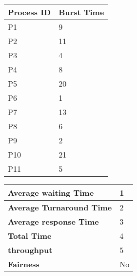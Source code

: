 \documentclass{article}
\begin{document}
\vspace{\baselineskip}
\hspace{1cm}
\begin{minipage}[t]{0.3\textwidth}
    \begin{tabularx}{\textwidth}{|l|X|}
    \hline
    \textbf{Process ID} & \textbf{Burst Time}\\
    \hline
    P1 & 9 \\
    P2 & 11 \\
    P3 & 4 \\
    P4 & 8 \\
    P5 & 20 \\
    P6 & 1 \\
    P7 & 13 \\
    P8 & 6 \\
    P9 & 2 \\
    P10 & 21 \\
    P11 & 5 \\
    \hline
    \end{tabularx}
\end{minipage}
\hspace{2cm}
\begin{minipage}[t!]{0.35\textwidth}
    \begin{tabularx}{\textwidth}{|l|X|}
    \hline
    \textbf{Average waiting Time} & 1 \\
    \hline
    \textbf{Average Turnaround Time} & 2 \\
    \hline
    \textbf{Average response Time} & 3 \\
    \hline
    \textbf{Total Time} & 4 \\
    \hline
    \textbf{throughput} & 5 \\
    \hline
    \textbf{Fairness} & No \\
    \hline
    \end{tabularx}
\end{minipage}


\newpage
\end{document}
